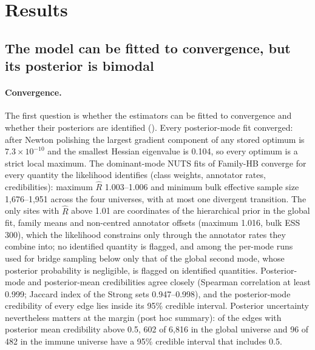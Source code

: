 \documentclass[11pt,a4paper]{article}
\begin{document}
\section{Results}\label{sec:results}

\subsection{The model can be fitted to convergence, but its posterior is bimodal}\label{sec:res-fit}

\paragraph{Convergence.}
The first question is whether the estimators can be fitted to convergence and whether their posteriors are identified ().
Every posterior-mode fit converged: after Newton polishing the largest gradient component of any stored optimum is \ensuremath{7.3\times10^{-10}} and the smallest Hessian eigenvalue is 0.104, so every optimum is a strict local maximum.
The dominant-mode NUTS fits of Family-HB converge for every quantity the likelihood identifies (class weights, annotator rates, credibilities): maximum $\widehat{R}$ 1.003--1.006 and minimum bulk effective sample size 1{,}676--1{,}951 across the four universes, with at most one divergent transition.
The only sites with $\widehat{R}$ above 1.01 are coordinates of the hierarchical prior in the global fit, family means and non-centred annotator offsets (maximum 1.016, bulk ESS 300), which the likelihood constrains only through the annotator rates they combine into; no identified quantity is flagged, and among the per-mode runs used for bridge sampling below only that of the global second mode, whose posterior probability is negligible, is flagged on identified quantities.
Posterior-mode and posterior-mean credibilities agree closely (Spearman correlation at least 0.999; Jaccard index of the Strong sets 0.947--0.998), and the posterior-mode credibility of every edge lies inside its 95\% credible interval.
Posterior uncertainty nevertheless matters at the margin (post hoc summary): of the edges with posterior mean credibility above 0.5, 602 of 6{,}816 in the global universe and 96 of 482 in the immune universe have a 95\% credible interval that includes 0.5.
\end{document}
